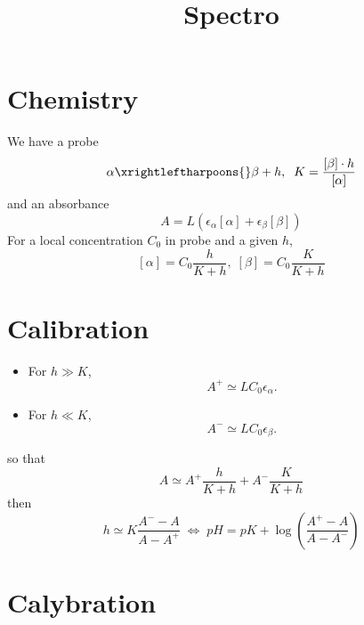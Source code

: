 \documentclass[aps]{revtex4}
\newcommand{\myconc}[1]{\left\lbrack{#1}\right\rbrack}
\begin{document}
\title{Spectro}
\maketitle

\section{Chemistry}

We have a probe
\begin{equation}
	\alpha \xrightleftharpoons{} \beta + h, \;\; K = \dfrac{\myconc{\beta}\cdot h}{ \myconc{\alpha} }
\end{equation}
and an absorbance
\begin{equation}
	A = L \left( \epsilon_\alpha \myconc{\alpha}  + \epsilon_\beta \myconc{\beta} \right)
\end{equation}
For a local concentration $C_0$ in probe and a given $h$,
\begin{equation}
	 \myconc{\alpha}  = C_0 \dfrac{h}{K+h},\; \myconc{\beta} = C_0 \dfrac{K}{K+h}
\end{equation}

\section{Calibration}
\begin{itemize}
\item For $h\gg K$, 
\begin{equation}
	A^+ \simeq L C_0 \epsilon_\alpha.
\end{equation}
\item For $h\ll K$,
\begin{equation}
		A^- \simeq L C_0 \epsilon_\beta.
\end{equation}
\end{itemize}
so that
\begin{equation}
	A \simeq A^+ \dfrac{h}{K+h} + A^- \dfrac{K}{K+h}
\end{equation}
then
\begin{equation}
	h \simeq K \dfrac{A^--A}{A-A^+} \; \Leftrightarrow \; pH = pK + \log \left( \dfrac{A^+-A}{A-A^-}\right) 
\end{equation}

\section{Calybration}
\end{document}

